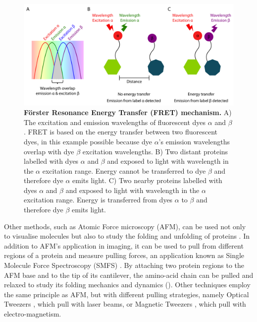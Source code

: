 \begin{figure}[tbh!]
    \centering
    \includegraphics[width=1\linewidth]{figures/experimental_techniques_fret.pdf}
    \caption{\textbf{Förster Resonance Energy Transfer (FRET) mechanism.} A) The excitation and emission wavelengths of fluorescent dyes $\alpha$ and $\beta$. FRET is based on the energy transfer between two fluorescent dyes, in this example possible because dye $\alpha$'s emission wavelengths overlap with dye $\beta$ excitation wavelengths. B) Two distant proteins labelled with dyes $\alpha$ and $\beta$ and exposed to light with wavelength in the $\alpha$ excitation range. Energy cannot be transferred to dye $\beta$ and therefore dye $\alpha$ emits light. C) Two nearby proteins labelled with dyes $\alpha$ and $\beta$ and exposed to light with wavelength in the $\alpha$ excitation range. Energy is transferred from dyes $\alpha$ to $\beta$ and therefore dye $\beta$ emits light.}
    \label{fig:chapter1:fret}
\end{figure}

Other methods, such as Atomic Force \Gls{microscopy} (AFM), can be used not only to visualise molecules but also to study the folding and unfolding of proteins \cite{van_gils_protein_2024}. In addition to AFM's application in imaging, it can be used to pull from different regions of a protein and measure pulling forces, an application known as Single Molecule Force Spectroscopy (SMFS) \cite{hughes_physics_2016}. By attaching two protein regions to the AFM base and to the tip of its cantilever, the amino-acid chain can be pulled and relaxed to study its folding mechanics and \gls{dynamics} (). Other techniques employ the same principle as AFM, but with different pulling strategies, namely Optical Tweezers \cite{bustamante_single-molecule_2020}, which pull with laser beams, or Magnetic Tweezers \cite{tapia-rojo_ephemeral_2019}, which pull with electro-magnetism.

